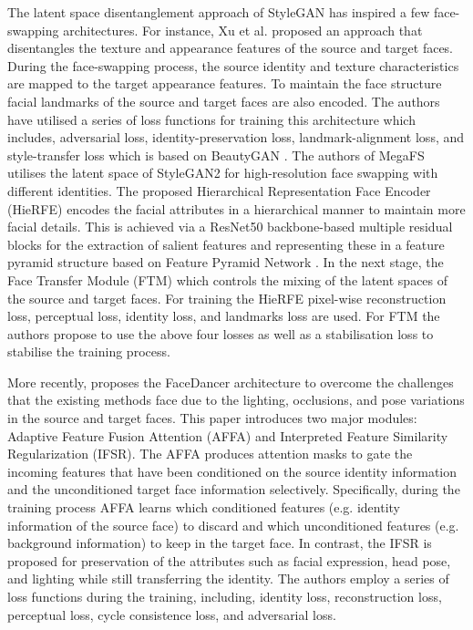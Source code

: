 The latent space disentanglement approach of StyleGAN has inspired a few face-swapping architectures. For instance, Xu et al. \cite{xu2022high} proposed an approach that disentangles the texture and appearance features of the source and target faces. During the face-swapping process, the source identity and texture characteristics are mapped to the target appearance features. To maintain the face structure facial landmarks of the source and target faces are also encoded. The authors have utilised a series of loss functions for training this architecture which includes, adversarial loss,  identity-preservation loss, landmark-alignment loss, and style-transfer loss which is based on BeautyGAN \cite{li2018beautygan}. The authors of MegaFS \cite{zhu2021one} utilises the latent space of StyleGAN2 for high-resolution face swapping with different identities. The proposed
Hierarchical Representation Face Encoder (HieRFE) \cite{xu2022high} encodes the facial attributes in a hierarchical manner to maintain more facial details. This is achieved via a ResNet50 backbone-based multiple residual blocks for the extraction of salient features and representing these in a feature pyramid structure based on Feature Pyramid Network \cite{lin2017feature}. In the next stage, the Face Transfer Module (FTM) which controls the mixing of the latent spaces of the source and target faces. For training the HieRFE pixel-wise reconstruction loss, perceptual loss, identity loss, and landmarks loss are used. For FTM the authors propose to use the above four losses as well as a stabilisation loss to stabilise the training process. 

More recently, \cite{rosberg2023facedancer} proposes the FaceDancer architecture to overcome the challenges that the existing methods face due to the lighting, occlusions, and pose variations in the source and target faces. This paper introduces two major modules: Adaptive Feature Fusion Attention (AFFA) and Interpreted Feature Similarity Regularization (IFSR). The AFFA produces attention masks to gate the incoming features that have been conditioned on the source identity information and the unconditioned target face information selectively. Specifically, during the training process AFFA learns which conditioned features (e.g. identity information of the source face) to discard and which unconditioned features (e.g. background information) to keep in the target face. In contrast, the IFSR is proposed for preservation of the attributes such as facial expression, head pose, and lighting while still transferring the identity. The authors employ a series of loss functions during the training, including, identity loss, reconstruction loss, perceptual loss, cycle consistence loss, and adversarial loss. 

